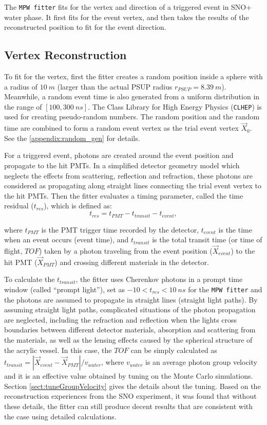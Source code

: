 The \texttt{MPW fitter} fits for the vertex and direction of a triggered event in SNO+ water phase. It first fits for the event vertex, and then takes the results of the reconstructed position to fit for the event direction.

\subsection{Vertex Reconstruction}

To fit for the vertex, first the fitter creates a random position inside a sphere with a radius of $10~m$ (larger than the actual PSUP radius $r_{PSUP}=8.39~m$). Meanwhile, a random event time is also generated from a uniform distribution in the range of $[100,300~ns]$. The Class Library for High Energy Physics (\texttt{CLHEP}) is used for creating pseudo-random numbers. The random position and the random time are combined to form a random event vertex as the trial event vertex $\vec{X}_0$. See the \ref{appendix:random_gen} for details.

For a triggered event, photons are created around the event position and propagate to the hit PMTs. In a simplified detector geometry model which neglects the effects from scattering, reflection and refraction, these photons are considered as propagating along straight lines connecting the trial event vertex to the hit PMTs. Then the fitter evaluates a timing parameter, called the time residual ($t_{res}$), which is defined as:
\begin{equation}
\label{tres_define}
t_{res}=t_{PMT} - t_{transit} - t_{event},
\end{equation}

where $t_{PMT}$ is the PMT trigger time recorded by the detector, $t_{event}$ is the time when an event occurs (event time), and $t_{transit}$ is the total transit time (or time of flight, $TOF$) taken by a photon traveling from the event position ($\vec{X}_{event}$) to the hit PMT ($\vec{X}_{PMT}$) and crossing different materials in the detector.

To calculate the $t_{transit}$, the fitter uses Cherenkov photons in a prompt time window (called ``prompt light''), set as $-10<t_{res}<10~ns$ for the \texttt{MPW fitter} and the photons are assumed to propagate in straight lines (straight light paths). By assuming straight light paths, complicated situations of the photon propagation are neglected, including the refraction and reflection when the lights cross boundaries between different detector materials, absorption and scattering from the materials, as well as the lensing effects caused by the spherical structure of the acrylic vessel. In this case, the $TOF$ can be simply calculated as $t_{transit}=|\vec{X}_{event}-\vec{X}_{PMT}|/v_{water}$, where $v_{water}$ is an average photon group velocity and it is an effective value obtained by tuning on the Monte Carlo simulations. Section \ref{sect:tuneGroupVelocity} gives the details about the tuning. Based on the reconstruction experiences from the SNO experiment, it was found that without these details, the fitter can still produce decent results that are consistent with the case using detailed calculations\cite{boulay2004direct,jones2011background}.  

